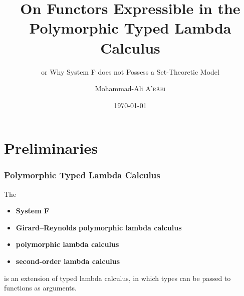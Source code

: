 \documentclass[10pt, compress]{beamer}
\title{On Functors Expressible in the Polymorphic Typed Lambda Calculus}
\subtitle{or Why System F does not Possess a Set-Theoretic Model}
\date{\today}
\author{Mohammad-Ali \textsc{A'r\^abi}}
\institute{Albert-Ludwigs-Universit\"at Freiburg}
\begin{document}
\maketitle

\section{Preliminaries}

\begin{frame}[fragile]
  \frametitle{Polymorphic Typed Lambda Calculus}
  
  The
  \begin{itemize}
      \item \textbf{System F}
      \item \textbf{Girard--Reynolds polymorphic lambda calculus}
      \item \textbf{polymorphic lambda calculus}
      \item \textbf{second-order lambda calculus}
  \end{itemize}
  is an extension of typed lambda calculus, in which types can be passed to functions as arguments.
\end{frame}



\end{document}
